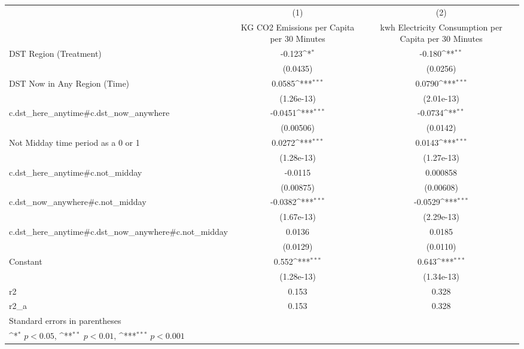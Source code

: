 {
\def\sym#1{\ifmmode^{#1}\else\(^{#1}\)\fi}
\begin{tabular}{l*{2}{c}}
\hline\hline
                    &\multicolumn{1}{c}{(1)}&\multicolumn{1}{c}{(2)}\\
                    &\multicolumn{1}{c}{KG CO2 Emissions per Capita per 30 Minutes}&\multicolumn{1}{c}{kwh Electricity Consumption per Capita per 30 Minutes}\\
\hline
DST Region (Treatment)&      -0.123\sym{*}  &      -0.180\sym{**} \\
                    &    (0.0435)         &    (0.0256)         \\
[1em]
DST Now in Any Region (Time)&      0.0585\sym{***}&      0.0790\sym{***}\\
                    &  (1.26e-13)         &  (2.01e-13)         \\
[1em]
c.dst\_here\_anytime#c.dst\_now\_anywhere&     -0.0451\sym{***}&     -0.0734\sym{**} \\
                    &   (0.00506)         &    (0.0142)         \\
[1em]
Not Midday time period as a 0 or 1&      0.0272\sym{***}&      0.0143\sym{***}\\
                    &  (1.28e-13)         &  (1.27e-13)         \\
[1em]
c.dst\_here\_anytime#c.not\_midday&     -0.0115         &    0.000858         \\
                    &   (0.00875)         &   (0.00608)         \\
[1em]
c.dst\_now\_anywhere#c.not\_midday&     -0.0382\sym{***}&     -0.0529\sym{***}\\
                    &  (1.67e-13)         &  (2.29e-13)         \\
[1em]
c.dst\_here\_anytime#c.dst\_now\_anywhere#c.not\_midday&      0.0136         &      0.0185         \\
                    &    (0.0129)         &    (0.0110)         \\
[1em]
Constant            &       0.552\sym{***}&       0.643\sym{***}\\
                    &  (1.28e-13)         &  (1.34e-13)         \\
\hline
r2                  &       0.153         &       0.328         \\
r2\_a                &       0.153         &       0.328         \\
\hline\hline
\multicolumn{3}{l}{\footnotesize Standard errors in parentheses}\\
\multicolumn{3}{l}{\footnotesize \sym{*} \(p<0.05\), \sym{**} \(p<0.01\), \sym{***} \(p<0.001\)}\\
\end{tabular}
}
